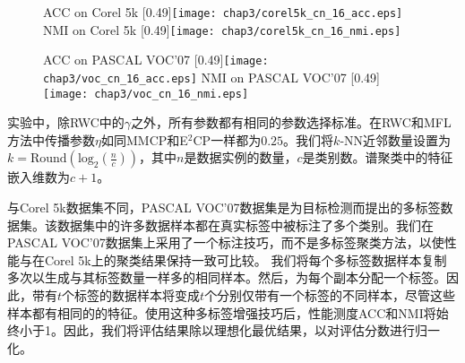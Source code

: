 \begin{figure}[t]
	\centering
					{ACC on  Corel 5k}
					[0.49\textwidth]{\texttt{[image: chap3/corel5k\_cn\_16\_acc.eps]}}
                    \label{fig3:corel5k_cn_16_acc}
					{NMI on  Corel 5k}
                    [0.49\textwidth]{\texttt{[image: chap3/corel5k\_cn\_16\_nmi.eps]}}
                    \label{fig3:corel5k_cn_16_nmi}
                    
	\centering
					{ACC on  PASCAL VOC'07}
					[0.49\textwidth]{\texttt{[image: chap3/voc\_cn\_16\_acc.eps]}}
                    \label{fig3:voc_cn_16_acc}
					{NMI on  PASCAL VOC'07}
					[0.49\textwidth]{\texttt{[image: chap3/voc\_cn\_16\_nmi.eps]}}
                    \label{fig3:voc_cn_16_nmi}
	\label{fig3:cn_16}
\end{figure} 

实验中，除RWC中的$\gamma $之外，所有参数都有相同的参数选择标准。在RWC和MFL方法中传播参数$ \eta $如同MMCP和E$^2$CP一样都为$ 0.25 $。我们将$k$-NN近邻数量设置为$ k = \mathrm{Round}(\mathrm{log}_2(\frac{n}{c}))$，其中$ n $是数据实例的数量，$ c $是类别数。谱聚类中的特征嵌入维数为$ c + 1 $。

与Corel 5k数据集不同，PASCAL VOC'07数据集是为目标检测而提出的多标签数据集。该数据集中的许多数据样本都在真实标签中被标注了多个类别。我们在PASCAL VOC'07数据集上采用了一个标注技巧，而不是多标签聚类方法，以使性能与在Corel 5k上的聚类结果保持一致可比较。
我们将每个多标签数据样本复制多次以生成与其标签数量一样多的相同样本。然后，为每个副本分配一个标签。因此，带有$ t $个标签的数据样本将变成$ t $个分别仅带有一个标签的不同样本，尽管这些样本都有相同的的特征。使用这种多标签增强技巧后，性能测度ACC和NMI将始终小于1。因此，我们将评估结果除以理想化最优结果，以对评估分数进行归一化。

